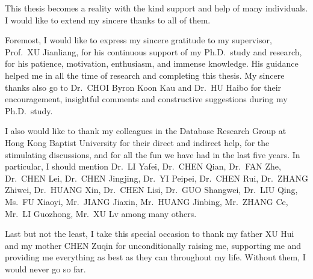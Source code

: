 \begin{acknowledgements}
This thesis becomes a reality with the kind support and help of many individuals. I would like to extend my sincere thanks to all of them.

Foremost, I would like to express my sincere gratitude to my supervisor, Prof.\ XU Jianliang, for his continuous support of my Ph.D.\ study and research, for his patience, motivation, enthusiasm, and immense knowledge. His guidance helped me in all the time of research and completing this thesis. My sincere thanks also go to Dr.\ CHOI Byron Koon Kau and Dr.\ HU Haibo for their encouragement, insightful comments and constructive suggestions during my Ph.D.\ study.

I also would like to thank my colleagues in the Database Research Group at Hong Kong Baptist University for their direct and indirect help, for the stimulating discussions, and for all the fun we have had in the last five years. In particular, I should mention Dr.\ LI Yafei, Dr.\ CHEN Qian, Dr.\ FAN Zhe, Dr.\ CHEN Lei, Dr.\ CHEN Jingjing, Dr.\ YI Peipei, Dr.\ CHEN Rui, Dr.\ ZHANG Zhiwei, Dr.\ HUANG Xin, Dr.\ CHEN Lisi, Dr.\ GUO Shangwei, Dr.\ LIU Qing, Ms.\ FU Xiaoyi, Mr.\ JIANG Jiaxin, Mr.\ HUANG Jinbing, Mr.\ ZHANG Ce, Mr.\ LI Guozhong, Mr.\ XU Lv among many others.

Last but not the least, I take this special occasion to thank my father XU Hui and my mother CHEN Zuqin for unconditionally raising me, supporting me and providing me everything as best as they can throughout my life. Without them, I would never go so far.
\end{acknowledgements}
